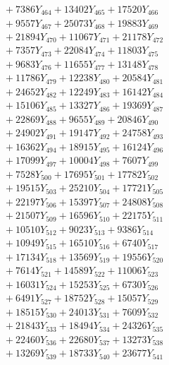 \documentclass[a4paper,10pt]{article}
\begin{document}
{\begin{align}
&\;  + 7386 Y_{464} + 13402 Y_{465} + 17520 Y_{466} \\[0.3ex]
&\;  + 9557 Y_{467} + 25073 Y_{468} + 19883 Y_{469} \\[0.3ex]
&\;  + 21894 Y_{470} + 11067 Y_{471} + 21178 Y_{472} \\[0.3ex]
&\;  + 7357 Y_{473} + 22084 Y_{474} + 11803 Y_{475} \\[0.3ex]
&\;  + 9683 Y_{476} + 11655 Y_{477} + 13148 Y_{478} \\[0.5ex]\allowbreak
&\;  + 11786 Y_{479} + 12238 Y_{480} + 20584 Y_{481} \\[0.3ex]
&\;  + 24652 Y_{482} + 12249 Y_{483} + 16142 Y_{484} \\[0.3ex]
&\;  + 15106 Y_{485} + 13327 Y_{486} + 19369 Y_{487} \\[0.3ex]
&\;  + 22869 Y_{488} + 9655 Y_{489} + 20846 Y_{490} \\[0.3ex]
&\;  + 24902 Y_{491} + 19147 Y_{492} + 24758 Y_{493} \\[0.3ex]
&\;  + 16362 Y_{494} + 18915 Y_{495} + 16124 Y_{496} \\[0.3ex]
&\;  + 17099 Y_{497} + 10004 Y_{498} + 7607 Y_{499} \\[0.3ex]
&\;  + 7528 Y_{500} + 17695 Y_{501} + 17782 Y_{502} \\[0.3ex]
&\;  + 19515 Y_{503} + 25210 Y_{504} + 17721 Y_{505} \\[0.3ex]
&\;  + 22197 Y_{506} + 15397 Y_{507} + 24808 Y_{508} \\[0.5ex]\allowbreak
&\;  + 21507 Y_{509} + 16596 Y_{510} + 22175 Y_{511} \\[0.3ex]
&\;  + 10510 Y_{512} + 9023 Y_{513} + 9386 Y_{514} \\[0.3ex]
&\;  + 10949 Y_{515} + 16510 Y_{516} + 6740 Y_{517} \\[0.3ex]
&\;  + 17134 Y_{518} + 13569 Y_{519} + 19556 Y_{520} \\[0.3ex]
&\;  + 7614 Y_{521} + 14589 Y_{522} + 11006 Y_{523} \\[0.3ex]
&\;  + 16031 Y_{524} + 15253 Y_{525} + 6730 Y_{526} \\[0.3ex]
&\;  + 6491 Y_{527} + 18752 Y_{528} + 15057 Y_{529} \\[0.3ex]
&\;  + 18515 Y_{530} + 24013 Y_{531} + 7609 Y_{532} \\[0.3ex]
&\;  + 21843 Y_{533} + 18494 Y_{534} + 24326 Y_{535} \\[0.3ex]
&\;  + 22460 Y_{536} + 22680 Y_{537} + 13273 Y_{538} \\[0.5ex]\allowbreak
&\;  + 13269 Y_{539} + 18733 Y_{540} + 23677 Y_{541} \\[0.3ex]

\end{align}}
\end{document}
